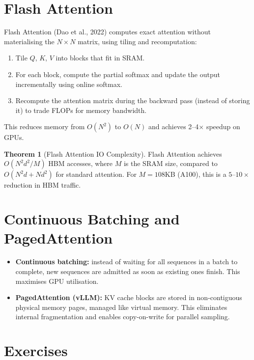 \documentclass[11pt,a4paper]{book}
\theoremstyle{definition}
\newtheorem{theorem}{Theorem}[chapter]
\begin{document}
\section{Flash Attention}

Flash Attention (Dao et al., 2022) computes exact attention without materialising the $N \times N$ matrix, using tiling and recomputation:

\begin{enumerate}
	\item Tile $Q$, $K$, $V$ into blocks that fit in SRAM.
	\item For each block, compute the partial softmax and update the output incrementally using online softmax.
	\item Recompute the attention matrix during the backward pass (instead of storing it) to trade FLOPs for memory bandwidth.
\end{enumerate}

This reduces memory from $O(N^2)$ to $O(N)$ and achieves 2--4$\times$ speedup on GPUs.

\begin{theorem}[Flash Attention IO Complexity]
	Flash Attention achieves $O(N^2 d^2 / M)$ HBM accesses, where $M$ is the SRAM size, compared to $O(N^2 d + N d^2)$ for standard attention. For $M = 108$KB (A100), this is a $5$--$10\times$ reduction in HBM traffic.
\end{theorem}

\section{Continuous Batching and PagedAttention}

\begin{itemize}
	\item \textbf{Continuous batching:} instead of waiting for all sequences in a batch to complete, new sequences are admitted as soon as existing ones finish. This maximises GPU utilisation.
	\item \textbf{PagedAttention (vLLM):} KV cache blocks are stored in non-contiguous physical memory pages, managed like virtual memory. This eliminates internal fragmentation and enables copy-on-write for parallel sampling.
\end{itemize}

\section{Exercises}
\end{document}
